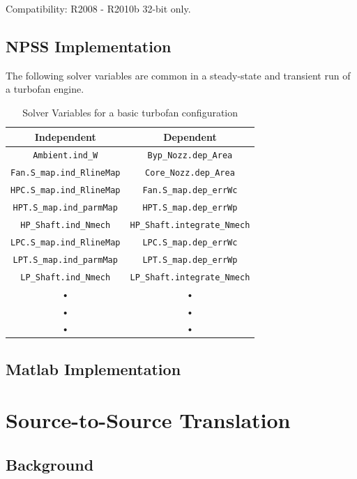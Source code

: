 \documentclass[heading.tex]{subfiles}
\begin{document}
Compatibility: R2008 - R2010b 32-bit only.

\subsection{NPSS Implementation}

The following solver variables are common in a steady-state and transient run of a turbofan
engine.

\begin{table}[H]
\centering
\begin{tabular}{|c|c|}
\hline 
Independent & Dependent \\ 
\hline \hline
\texttt{Ambient.ind\_W} & \texttt{Byp\_Nozz.dep\_Area} \\ 
\hline 
\texttt{Fan.S\_map.ind\_RlineMap} & \texttt{Core\_Nozz.dep\_Area} \\ 
\hline 
\texttt{HPC.S\_map.ind\_RlineMap} & \texttt{Fan.S\_map.dep\_errWc} \\ 
\hline 
\texttt{HPT.S\_map.ind\_parmMap} & \texttt{HPT.S\_map.dep\_errWp} \\ 
\hline 
\texttt{HP\_Shaft.ind\_Nmech} & \texttt{HP\_Shaft.integrate\_Nmech} \\ 
\hline 
\texttt{LPC.S\_map.ind\_RlineMap} & \texttt{LPC.S\_map.dep\_errWc} \\ 
\hline 
\texttt{LPT.S\_map.ind\_parmMap} & \texttt{LPT.S\_map.dep\_errWp} \\ 
\hline 
\texttt{LP\_Shaft.ind\_Nmech} & \texttt{LP\_Shaft.integrate\_Nmech} \\ 
\hline 
• & • \\ 
\hline 
• & • \\ 
\hline 
• & • \\ 
\hline 
\end{tabular} 
\caption{Solver Variables for a basic turbofan configuration}
\label{tab:SolverVariables}
\end{table}


\subsection{Matlab Implementation}

\section{Source-to-Source Translation}
\subsection{Background}
\end{document}
